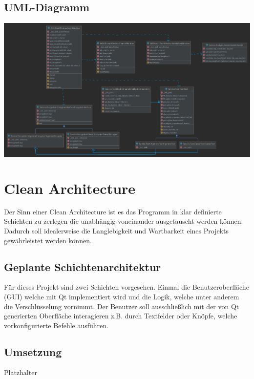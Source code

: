 \documentclass[12pt]{article}
\begin{document}

\subsection{UML-Diagramm}
\begin{center}
	\includegraphics[width=15cm]{bilder/UML_Diagram_professionaly_edited.png}
\end{center}
\newpage

\section{Clean Architecture}
Der Sinn einer Clean Architecture ist es das Programm in klar definierte Schichten zu zerlegen die unabhängig voneinander ausgetauscht werden können. Dadurch soll idealerweise die Langlebigkeit und Wartbarkeit eines Projekts gewährleistet werden können.

\subsection{Geplante Schichtenarchitektur}
Für dieses Projekt sind zwei Schichten vorgesehen. Einmal die Benutzeroberfläche (GUI) welche mit Qt implementiert wird und die Logik, welche unter anderem die Verschlüsselung vornimmt. Der Benutzer soll ausschließlich mit der von Qt generierten Oberfläche interagieren z.B. durch Textfelder oder Knöpfe, welche vorkonfigurierte Befehle ausführen.

\subsection{Umsetzung}
Platzhalter
\end{document}

